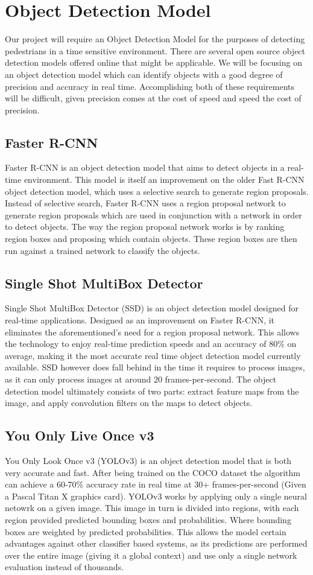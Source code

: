 \documentclass[onecolumn, draftclsnofoot,10pt, compsoc]{IEEEtran}
\begin{document}
\section{Object Detection Model}
Our project will require an Object Detection Model for the purposes of detecting pedestrians in a time sensitive environment. There are several open source object detection models offered online that might be applicable. We will be focusing on an object detection model which can identify objects with a good degree of precision and accuracy in real time. Accomplishing both of these requirements will be difficult, given precision comes at the cost of speed and speed the cost of precision.
\subsection{Faster R-CNN}
Faster R-CNN is an object detection model that aims to detect objects in a real-time environment. This model is itself an improvement on the older Fast R-CNN object detection model, which uses a selective search to generate region proposals\cite{faster-r-cnn}. Instead of selective search, Faster R-CNN uses a region proposal network to generate region proposals which are used in conjunction with a network in order to detect objects. The way the region proposal network works is by ranking region boxes and proposing which contain objects. These region boxes are then run against a trained network to classify the objects.
\subsection{Single Shot MultiBox Detector}
Single Shot MultiBox Detector (SSD) is an object detection model designed for real-time applications. Designed as an improvement on Faster R-CNN, it eliminates the aforementioned's need for a region proposal network. This allows the technology to enjoy real-time prediction speeds and an accuracy of 80\% on average, making it the most accurate real time object detection model currently available\cite{SSD}. SSD however does fall behind in the time it requires to process images, as it can only process images at around 20 frames-per-second. The object detection model ultimately consists of two parts: extract feature maps from the image, and apply convolution filters on the maps to detect objects.
\subsection{You Only Live Once v3}
You Only Look Once v3 (YOLOv3) is an object detection model that is both very accurate and fast. After being trained on the COCO dataset the algorithm can achieve a 60-70\% accuracy rate in real time at 30+ frames-per-second (Given a Pascal Titan X graphics card)\cite{YOLOv3}. YOLOv3 works by applying only a single neural netowrk on a given image. This image in turn is divided into regions, with each region provided predicted bounding boxes and probabilities. Where bounding boxes are weighted by predicted probabilities. This allows the model certain advantages against other classifier based systems, as its predictions are performed over the entire image (giving it a global context) and use only a single network evaluation instead of thousands.
\end{document}
